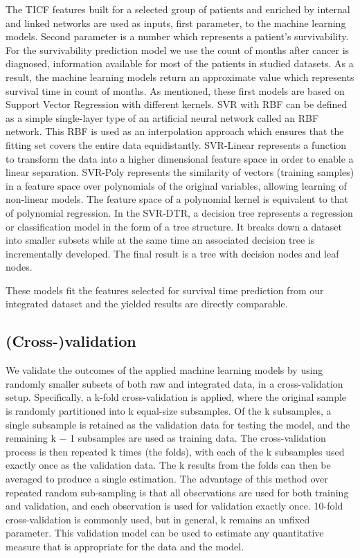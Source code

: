 \documentclass{bmcart}
\begin{document}
The TICF features built for a selected group of patients and enriched by
internal and linked networks are used as inputs, first parameter, to
the machine learning models. Second parameter is a number which
represents a patient{\textquoteright}s survivability. For the
survivability prediction model we use the count of months after cancer
is diagnosed, information available for most of the patients in studied
datasets. As a result, the machine learning models return an
approximate value which represents survival time in count of months. As
mentioned, these first models are based on Support Vector Regression
with different kernels. SVR with RBF can be defined as a simple
single-layer type of an artificial neural network called an RBF
network. This RBF is used as an interpolation approach which ensures
that the fitting set covers the entire data equidistantly. SVR-Linear
represents a function to  transform the data into a higher dimensional
feature space in order to enable a linear separation. SVR-Poly
represents the similarity of vectors (training samples) in a feature
space over polynomials of the original variables, allowing learning of
non-linear models. The feature space of a polynomial kernel is
equivalent to that of polynomial regression. In the SVR-DTR, a decision
tree represents a regression or classification model in the form of a
tree structure. It breaks down a dataset into smaller subsets while at
the same time an associated decision tree is incrementally developed.
The final result is a tree with decision nodes and leaf nodes.

These models fit the features selected for survival time prediction from
our integrated dataset and the yielded results are directly comparable.


\subsection{(Cross-)validation}

We validate the outcomes of the applied machine learning models by using
randomly smaller subsets of both raw and integrated data, in a
cross-validation setup. Specifically, a k{}-fold cross-validation is
applied, where the original sample is randomly partitioned into k
equal-size subsamples. Of the k subsamples, a single subsample is
retained as the validation data for testing the model, and the
remaining k $-$ 1 subsamples are used as training data. The
cross-validation process is then repeated k times (the folds), with
each of the k subsamples used exactly once as the validation data. The
k results from the folds can then be averaged to produce a single
estimation. The advantage of this method over repeated random
sub-sampling is that all observations are used for both training and
validation, and each observation is used for validation exactly once.
10-fold cross-validation is commonly used, but in general, k remains an
unfixed parameter. This validation model can be used to estimate any
quantitative measure that is appropriate for the data and the model. 
\end{document}
